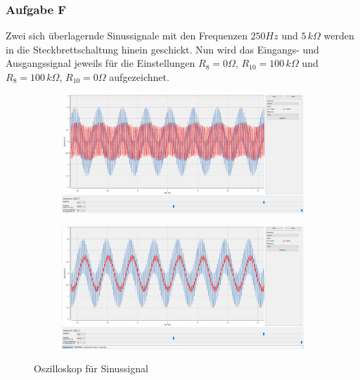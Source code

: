 \subsubsection{Aufgabe F}
\label{F}
Zwei sich überlagernde Sinussignale mit den Frequenzen $\si{250}{Hz}$ und $\si{5}{\,k\Omega}$ werden in die Steckbrettschaltung hinein geschickt. Nun wird das Eingangs- und Ausgangssignal jeweils für die Einstellungen $R_{8}=\si{0}{\Omega}$, $R_{10}=\si{100}{\,k\Omega}$ und $R_{8}=\si{100}{\,k\Omega}$, $R_{10}=\si{0}{\Omega}$ aufgezeichnet.

\begin{figure}[h]
\centering
\begin{subfigure}{1\textwidth}
\centering
  \includegraphics[width=17cm]{pics/3.3f_0_100}
  \label{sin0_1}
\end{subfigure}
\begin{subfigure}{1\textwidth}
\centering
  \includegraphics[width=17cm]{pics/3.3f_100_0}
  \label{sin1_0}
\end{subfigure}
\caption{Oszilloskop für Sinussignal}
\end{figure}



